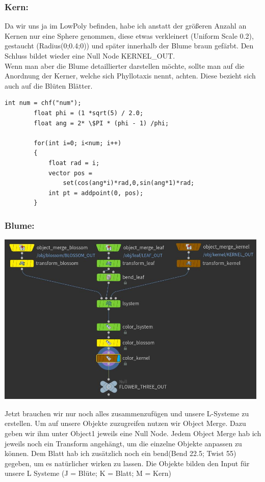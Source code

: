 \documentclass[paper=a4,fontsize=12pt,ngerman]{scrartcl}
\begin{document}
	\subsubsection*{Kern:}
	Da wir uns ja im LowPoly befinden, habe ich anstatt der größeren Anzahl an Kernen nur eine Sphere genommen, diese etwas verkleinert (Uniform Scale 0.2), gestaucht (Radius(0;0.4;0)) und später innerhalb der Blume braun gefärbt. Den Schluss bildet wieder eine Null Node KERNEL\_OUT.\\
	Wenn man aber die Blume detaillierter darstellen möchte, sollte man auf die Anordnung der Kerner, welche sich Phyllotaxis nennt, achten. Diese bezieht sich auch auf die Blüten Blätter. 
	\begin{lstlisting}[basicstyle=\scriptsize]
		int num = chf("num");
		float phi = (1 *sqrt(5) / 2.0;
		float ang = 2* \$PI * (phi - 1) /phi;
		
		for(int i=0; i<num; i++)
		{
			float rad = i;
			vector pos = 
				set(cos(ang*i)*rad,0,sin(ang*1)*rad;
			int pt = addpoint(0, pos);
		}	
	\end{lstlisting} 
	\subsubsection*{Blume:}
	\begin{minipage}{0.5\textwidth}
		\includegraphics[width=0.98\textwidth]{graphics/flower_three.JPG}
	\end{minipage}
	\begin{minipage}{0.5\textwidth}
		Jetzt brauchen wir nur noch alles zusammenzufügen und unsere L-Systeme zu erstellen. 
		Um auf unsere Objekte zuzugreifen nutzen wir Object Merge. Dazu geben wir ihm unter Object1 jeweils eine Null Node. Jedem Object Merge hab ich jeweils noch ein Transform angehängt, um die einzelne Objekte anpassen zu können. Dem Blatt hab ich zusätzlich noch ein bend(Bend 22.5; Twist 55) gegeben, um es natürlicher wirken zu lassen.
		Die Objekte bilden den Input für unsere L Systeme (J = Blüte; K = Blatt; M = Kern)
	\end{minipage}
\end{document}
